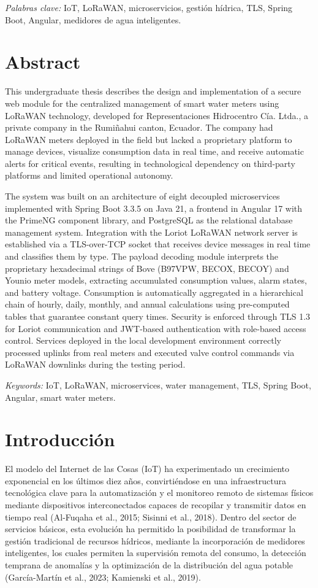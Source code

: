 \documentclass[12pt,a4paper,oneside]{report}
\begin{document}
\emph{Palabras clave:} IoT, LoRaWAN, microservicios, gestión hídrica, TLS, Spring Boot, Angular, medidores de agua inteligentes.

\clearpage
\chapter*{Abstract}

This undergraduate thesis describes the design and implementation of a secure web module for the centralized management of smart water meters using LoRaWAN technology, developed for Representaciones Hidrocentro Cía. Ltda., a private company in the Rumiñahui canton, Ecuador. The company had LoRaWAN meters deployed in the field but lacked a proprietary platform to manage devices, visualize consumption data in real time, and receive automatic alerts for critical events, resulting in technological dependency on third-party platforms and limited operational autonomy.

The system was built on an architecture of eight decoupled microservices implemented with Spring Boot 3.3.5 on Java 21, a frontend in Angular 17 with the PrimeNG component library, and PostgreSQL as the relational database management system. Integration with the Loriot LoRaWAN network server is established via a TLS-over-TCP socket that receives device messages in real time and classifies them by type. The payload decoding module interprets the proprietary hexadecimal strings of Bove (B97VPW, BECOX, BECOY) and Younio meter models, extracting accumulated consumption values, alarm states, and battery voltage. Consumption is automatically aggregated in a hierarchical chain of hourly, daily, monthly, and annual calculations using pre-computed tables that guarantee constant query times. Security is enforced through TLS 1.3 for Loriot communication and JWT-based authentication with role-based access control. Services deployed in the local development environment correctly processed uplinks from real meters and executed valve control commands via LoRaWAN downlinks during the testing period.

\emph{Keywords:} IoT, LoRaWAN, microservices, water management, TLS, Spring Boot, Angular, smart water meters.

\clearpage
\chapter{Introducción}

El modelo del Internet de las Cosas (IoT) ha experimentado un crecimiento exponencial en los últimos diez años, convirtiéndose en una infraestructura tecnológica clave para la automatización y el monitoreo remoto de sistemas físicos mediante dispositivos interconectados capaces de recopilar y transmitir datos en tiempo real (Al-Fuqaha et al., 2015; Sisinni et al., 2018). Dentro del sector de servicios básicos, esta evolución ha permitido la posibilidad de transformar la gestión tradicional de recursos hídricos, mediante la incorporación de medidores inteligentes, los cuales permiten la supervisión remota del consumo, la detección temprana de anomalías y la optimización de la distribución del agua potable (García-Martín et al., 2023; Kamienski et al., 2019).
\end{document}
